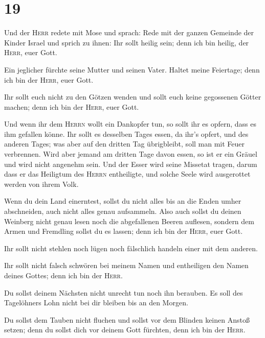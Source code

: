 \hypertarget{section-18}{%
\section{19}\label{section-18}}

 Und der \textsc{Herr} redete mit Mose und sprach:
 Rede mit der ganzen Gemeinde der Kinder Israel und sprich
zu ihnen: Ihr sollt heilig sein; denn ich bin heilig, der \textsc{Herr},
euer Gott.

 Ein jeglicher fürchte seine Mutter und seinen Vater.
Haltet meine Feiertage; denn ich bin der \textsc{Herr}, euer Gott.

 Ihr sollt euch nicht zu den Götzen wenden und sollt euch
keine gegossenen Götter machen; denn ich bin der \textsc{Herr}, euer
Gott.

 Und wenn ihr dem \textsc{Herrn} wollt ein Dankopfer tun,
so sollt ihr es opfern, dass es ihm gefallen könne.  Ihr
sollt es desselben Tages essen, da ihr's opfert, und des anderen Tages;
was aber auf den dritten Tag übrigbleibt, soll man mit Feuer verbrennen.
 Wird aber jemand am dritten Tage davon essen, so ist er
ein Gräuel und wird nicht angenehm sein.  Und der Esser
wird seine Missetat tragen, darum dass er das Heiligtum des
\textsc{Herrn} entheiligte, und solche Seele wird ausgerottet werden von
ihrem Volk.

 Wenn du dein Land einerntest, sollst du nicht alles bis
an die Enden umher abschneiden, auch nicht alles genau aufsammeln.
 Also auch sollst du deinen Weinberg nicht genau lesen
noch die abgefallenen Beeren auflesen, sondern dem Armen und Fremdling
sollst du es lassen; denn ich bin der \textsc{Herr}, euer Gott.

 Ihr sollt nicht stehlen noch lügen noch fälschlich
handeln einer mit dem anderen.

 Ihr sollt nicht falsch schwören bei meinem Namen und
entheiligen den Namen deines Gottes; denn ich bin der \textsc{Herr}.

 Du sollst deinem Nächsten nicht unrecht tun noch ihn
berauben. Es soll des Tagelöhners Lohn nicht bei dir bleiben bis an den
Morgen.

 Du sollst dem Tauben nicht fluchen und sollst vor dem
Blinden keinen Anstoß setzen; denn du sollst dich vor deinem Gott
fürchten, denn ich bin der \textsc{Herr}.

